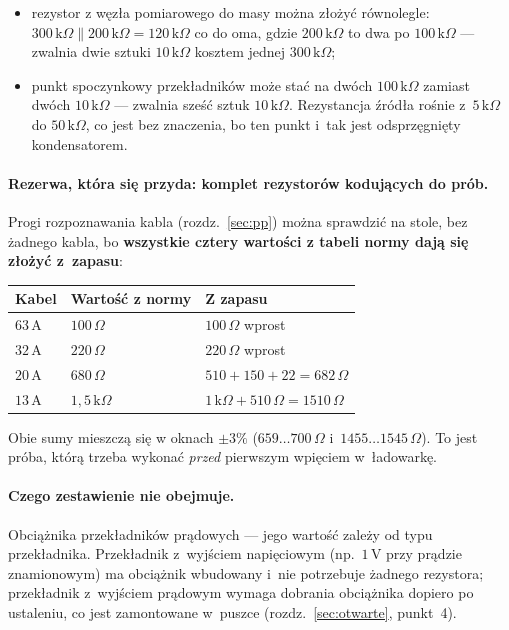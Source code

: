 \documentclass[a4paper,11pt]{article}
\newcommand{\ohm}{\,\Omega}
\newcommand{\kohm}{\,\mathrm{k}\Omega}
\newcommand{\volt}{\,\mathrm{V}}
\newcommand{\amp}{\,\mathrm{A}}
\begin{document}
\begin{itemize}
\item rezystor z węzła pomiarowego do masy można złożyć równolegle:
      $300\kohm \parallel 200\kohm = 120\kohm$ co do oma, gdzie $200\kohm$ to dwa
      po $100\kohm$ --- zwalnia dwie sztuki $10\kohm$ kosztem jednej $300\kohm$;
\item punkt spoczynkowy przekładników może stać na dwóch $100\kohm$ zamiast dwóch
      $10\kohm$ --- zwalnia sześć sztuk $10\kohm$. Rezystancja źródła rośnie
      z~$5\kohm$ do $50\kohm$, co jest bez znaczenia, bo ten punkt i~tak jest
      odsprzęgnięty kondensatorem.
\end{itemize}

\paragraph{Rezerwa, która się przyda: komplet rezystorów kodujących do prób.}
Progi rozpoznawania kabla (rozdz.~\ref{sec:pp}) można sprawdzić na stole, bez
żadnego kabla, bo \textbf{wszystkie cztery wartości z tabeli normy dają się złożyć
z~zapasu}:

\begin{center}
\begin{tabular}{lll}
\toprule
Kabel & Wartość z normy & Z zapasu \\
\midrule
$63\amp$ & $100\ohm$   & $100\ohm$ wprost \\
$32\amp$ & $220\ohm$   & $220\ohm$ wprost \\
$20\amp$ & $680\ohm$   & $510+150+22=682\ohm$ \\
$13\amp$ & $1{,}5\kohm$ & $1\kohm+510\ohm=1510\ohm$ \\
\bottomrule
\end{tabular}
\end{center}

Obie sumy mieszczą się w oknach $\pm3\%$ ($659\ldots700\ohm$
i~$1455\ldots1545\ohm$). To jest próba, którą trzeba wykonać \emph{przed} pierwszym
wpięciem w~ładowarkę.

\paragraph{Czego zestawienie nie obejmuje.} Obciążnika przekładników prądowych ---
jego wartość zależy od typu przekładnika. Przekładnik z~wyjściem napięciowym
(np.~$1\volt$ przy prądzie znamionowym) ma obciążnik wbudowany i~nie potrzebuje
żadnego rezystora; przekładnik z~wyjściem prądowym wymaga dobrania obciążnika
dopiero po ustaleniu, co jest zamontowane w~puszce
(rozdz.~\ref{sec:otwarte}, punkt~4).
\end{document}
